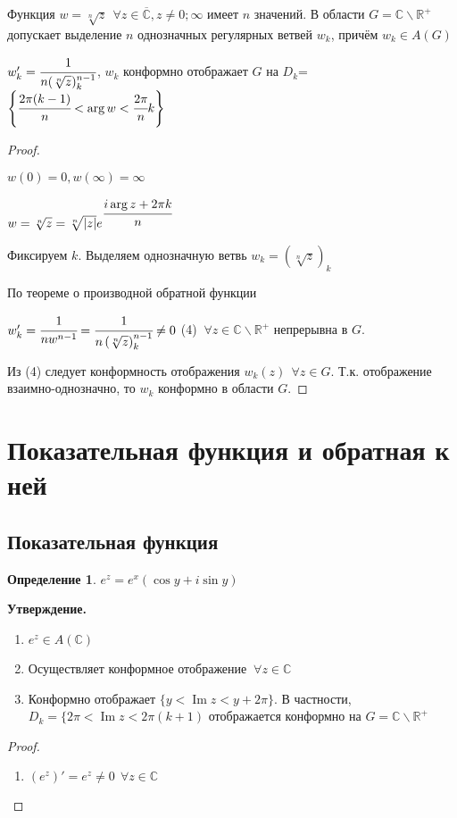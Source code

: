 \documentclass[draft]{article}
\newcommand{\forcenewline}{$\phantom{\mbox{newline}}$\newline}
\newcommand{\R}{\mathbb{R}}
\renewcommand{\C}{\mathbb{C}}
\renewcommand{\bar}{\overline}
\renewcommand{\Im}{\mathop{\mathrm{Im}}\nolimits}
\newcommand{\F}{\ \forall}
\newcommand{\CC}{\bar{\C}}
\newcommand{\opr}[1]{\begin{opred}#1\end{opred}}
\newtheorem*{opred}{Определение}
\theoremstyle{remark}
\begin{document}
Функция $w=\sqrt[n]{z}\ \F z\in\CC,z\neq 0;\infty$ имеет $n$ значений. В области $G=\C\smallsetminus\R^+$ допускает выделение $n$ однозначных регулярных ветвей $w_k$, причём $w_k\in A(G)$

$w_k'=\cfrac{1}{n(\sqrt[n]{z})^{n-1}_k}$, $w_k$ конформно отображает $G$ на $D_k$=$\left\{\cfrac{2\pi(k-1)}{n}<\arg w<\cfrac{2\pi}{n}k\right\}$

\begin{proof}
\forcenewline

$w(0)=0, w(\infty)=\infty$

$w=\sqrt[n]{z}=\sqrt[n]{|z|}e^{\cfrac{i\arg z+2\pi k}{n}}$

Фиксируем $k$. Выделяем однозначную ветвь $w_k=\left(\sqrt[n]{z}\right)_k$

По теореме о производной обратной функции

$w_k'=\cfrac{1}{nw^{n-1}}=\cfrac{1}{n\left(\sqrt[n]{z}\right)^{n-1}_k}\neq 0$ (4) $\F z\in\C\smallsetminus\R^+$ непрерывна в $G$.

Из (4) следует конформность отображения $w_k(z)\ \F z\in G$. Т.к. отображение взаимно-однозначно, то $w_k$ конформно в области $G$.
\end{proof}

\newpage

\section{Показательная функция и обратная к ней}

\subsection{Показательная функция}

\opr{$e^z=e^x(\cos y+i\sin y)$}
{\bfseries Утверждение.}
\begin{enumerate}
\item $e^z\in A(\C)$
\item Осуществляет конформное отображение $\F z\in\C$
\item Конформно отображает $\{y<\Im z<y+2\pi\}$. В частности, $D_k=\{2\pi <\Im z<2\pi(k+1)$ отображается конформно на $G=\C\smallsetminus\R^+$
\end{enumerate}
\begin{proof}
\forcenewline
\begin{enumerate}
\item $(e^z)'=e^z\neq0\ \F z\in\C$
\end{enumerate}
\end{proof}
\end{document}
